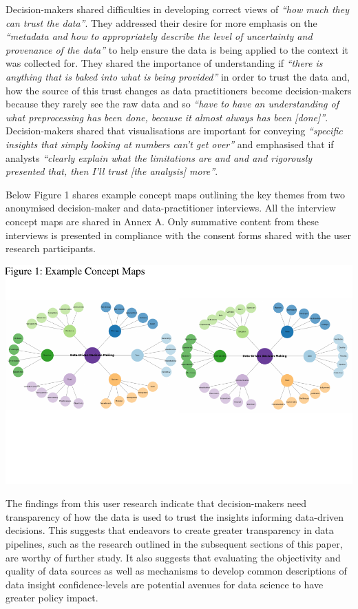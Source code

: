 \documentclass{article}
\begin{document}
Decision-makers shared difficulties in developing correct views of
\emph{``how much they can trust the data''}. They addressed their desire
for more emphasis on the \emph{``metadata and how to appropriately
describe the level of uncertainty and provenance of the data''} to help
ensure the data is being applied to the context it was collected for.
They shared the importance of understanding if \emph{``there is anything
that is baked into what is being provided''} in order to trust the data
and, how the source of this trust changes as data practitioners become
decision-makers because they rarely see the raw data and so \emph{``have
to have an understanding of what preprocessing has been done, because it
almost always has been {[}done{]}''}. Decision-makers shared that
visualisations are important for conveying \emph{``specific insights
that simply looking at numbers can't get over''} and emphasised that if
analysts \emph{``clearly explain what the limitations are and and and
rigorously presented that, then I'll trust {[}the analysis{]} more''}.

Below Figure 1 shares example concept maps outlining the key themes from
two anonymised decision-maker and data-practitioner interviews. All the
interview concept maps are shared in Annex A. Only summative content
from these interviews is presented in compliance with the consent forms
shared with the user research participants.

\includegraphics{210431461_CSC8639_Dissertation_files/figure-latex/ConceptMapExample-1.pdf}
\vspace{-3.3cm}

The findings from this user research indicate that decision-makers need
transparency of how the data is used to trust the insights informing
data-driven decisions. This suggests that endeavors to create greater
transparency in data pipelines, such as the research outlined in the
subsequent sections of this paper, are worthy of further study. It also
suggests that evaluating the objectivity and quality of data sources as
well as mechanisms to develop common descriptions of data insight
confidence-levels are potential avenues for data science to have greater
policy impact.
\end{document}
